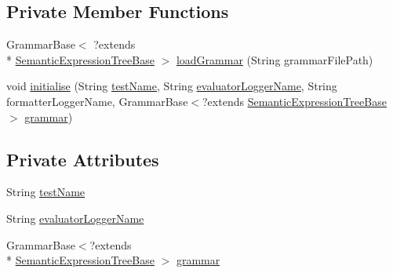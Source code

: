 \subsection*{Private Member Functions}
\begin{DoxyCompactItemize}
\item 
Grammar\-Base$<$ ?extends \\*
\hyperlink{interfaceit_1_1emarolab_1_1cagg_1_1core_1_1evaluation_1_1semanticGrammar_1_1syntaxCompiler_1_1SemanticExpressionTreeBase}{Semantic\-Expression\-Tree\-Base} $>$ \hyperlink{classit_1_1emarolab_1_1cagg_1_1interfaces_1_1CaggMultiGrammarTesterConfiguration_abea337685f733621c85c0a9ce4f9147b}{load\-Grammar} (String grammar\-File\-Path)
\item 
void \hyperlink{classit_1_1emarolab_1_1cagg_1_1interfaces_1_1CaggMultiGrammarTesterConfiguration_ae1beaccec30063954942c577631abd70}{initialise} (String \hyperlink{classit_1_1emarolab_1_1cagg_1_1interfaces_1_1CaggMultiGrammarTesterConfiguration_a0257b98c18078e99c10ab42c4954c2c0}{test\-Name}, String \hyperlink{classit_1_1emarolab_1_1cagg_1_1interfaces_1_1CaggMultiGrammarTesterConfiguration_ad95451345d9a7ec26774a89bffdc2502}{evaluator\-Logger\-Name}, String formatter\-Logger\-Name, Grammar\-Base$<$?extends \hyperlink{interfaceit_1_1emarolab_1_1cagg_1_1core_1_1evaluation_1_1semanticGrammar_1_1syntaxCompiler_1_1SemanticExpressionTreeBase}{Semantic\-Expression\-Tree\-Base} $>$ \hyperlink{classit_1_1emarolab_1_1cagg_1_1interfaces_1_1CaggMultiGrammarTesterConfiguration_a3deb04a2cc12d4df6830b0523e08dced}{grammar})
\end{DoxyCompactItemize}
\subsection*{Private Attributes}
\begin{DoxyCompactItemize}
\item 
String \hyperlink{classit_1_1emarolab_1_1cagg_1_1interfaces_1_1CaggMultiGrammarTesterConfiguration_a0257b98c18078e99c10ab42c4954c2c0}{test\-Name}
\item 
String \hyperlink{classit_1_1emarolab_1_1cagg_1_1interfaces_1_1CaggMultiGrammarTesterConfiguration_ad95451345d9a7ec26774a89bffdc2502}{evaluator\-Logger\-Name}
\item 
Grammar\-Base$<$?extends \\*
\hyperlink{interfaceit_1_1emarolab_1_1cagg_1_1core_1_1evaluation_1_1semanticGrammar_1_1syntaxCompiler_1_1SemanticExpressionTreeBase}{Semantic\-Expression\-Tree\-Base} $>$ \hyperlink{classit_1_1emarolab_1_1cagg_1_1interfaces_1_1CaggMultiGrammarTesterConfiguration_a3deb04a2cc12d4df6830b0523e08dced}{grammar}
\end{DoxyCompactItemize}


